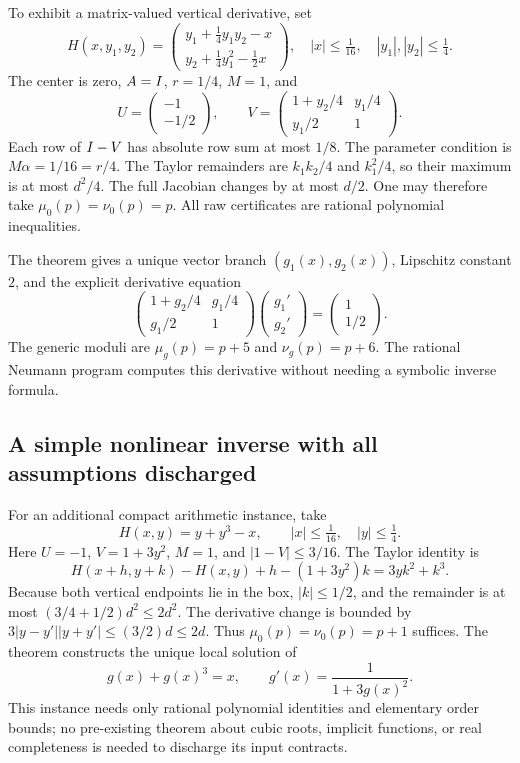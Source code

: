 To exhibit a matrix-valued vertical derivative, set
\[
 H(x,y_1,y_2)=
 \begin{pmatrix}
  y_1+\tfrac14y_1y_2-x\\
  y_2+\tfrac14y_1^2-\tfrac12x
 \end{pmatrix},
 \quad |x|\le\tfrac1{16},\quad |y_1|,|y_2|\le\tfrac14.
\]
The center is zero, \(A=I\), \(r=1/4\), \(M=1\), and
\[
 U=\begin{pmatrix}-1\\-1/2\end{pmatrix},\qquad
 V=\begin{pmatrix}
  1+y_2/4&y_1/4\\
  y_1/2&1
 \end{pmatrix}.
\]
Each row of \(I-V\) has absolute row sum at most \(1/8\).
The parameter condition is \(M\alpha=1/16=r/4\).
The Taylor remainders are \(k_1k_2/4\) and \(k_1^2/4\),
so their maximum is at most \(d^2/4\).
The full Jacobian changes by at most \(d/2\).
One may therefore take \(\mu_0(p)=\nu_0(p)=p\).
All raw certificates are rational polynomial inequalities.

The theorem gives a unique vector branch
\((g_1(x),g_2(x))\), Lipschitz constant \(2\), and the
explicit derivative equation
\[
 \begin{pmatrix}
  1+g_2/4&g_1/4\\
  g_1/2&1
 \end{pmatrix}
 \begin{pmatrix}g_1'\\g_2'\end{pmatrix}
 =\begin{pmatrix}1\\1/2\end{pmatrix}.
\]
The generic moduli are \(\mu_g(p)=p+5\) and
\(\nu_g(p)=p+6\).
The rational Neumann program computes this derivative
without needing a symbolic inverse formula.

\subsection{A simple nonlinear inverse with all assumptions discharged}

For an additional compact arithmetic instance, take
\[
 H(x,y)=y+y^3-x,\qquad
 |x|\le\tfrac1{16},\quad |y|\le\tfrac14.
\]
Here \(U=-1\), \(V=1+3y^2\), \(M=1\), and
\(|1-V|\le3/16\). The Taylor identity is
\[
 H(x+h,y+k)-H(x,y)+h-(1+3y^2)k=3yk^2+k^3.
\]
Because both vertical endpoints lie in the box,
\(|k|\le1/2\), and the remainder is at most
\((3/4+1/2)d^2\le2d^2\).
The derivative change is bounded by
\(3|y-y'||y+y'|\le(3/2)d\le2d\).
Thus \(\mu_0(p)=\nu_0(p)=p+1\) suffices.
The theorem constructs the unique local solution of
\[
 g(x)+g(x)^3=x,\qquad
 g'(x)=\frac1{1+3g(x)^2}.
\]
This instance needs only rational polynomial identities
and elementary order bounds; no pre-existing theorem
about cubic roots, implicit functions, or real completeness
is needed to discharge its input contracts.

